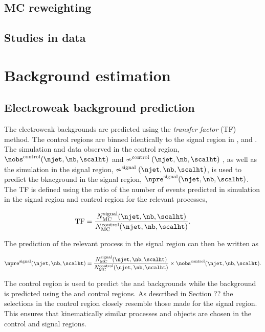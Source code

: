 \subsection{MC reweighting}
\subsection{Studies in data}
\section{Background estimation}
\subsection{Electroweak background prediction}
The electroweak backgrounds are predicted using the \emph{transfer factor} (TF)
method. The control regions are binned identically
to the signal region in \scalht, \nj and \nb. The simulation and data observed in the control region,
$\nobs^{\rm control}(\njet,\nb,\scalht)$ and $\nsim^{\rm control}(\njet,\nb,\scalht)$ 
, as well as the simulation in the signal region, $\nsim^{\rm signal}(\njet,\nb,\scalht)$, 
is used to predict the bkacground in the signal region, $\npre^{\rm signal}(\njet,\nb,\scalht)$. 
The TF is defined using the ratio of the number of events predicted in 
simulation in the signal region and control region for the relevant processes,

\begin{equation}
  \label{equ:tf-ratio}
  {\rm TF} = \frac{N_{\rm MC}^{\rm signal}(\njet,\nb,\scalht)}{N_{\rm
      MC}^{\rm control}(\njet,\nb,\scalht)}.
\end{equation}

The prediction of the relevant process in the signal region can then be written as

\begin{equation}
  \label{equ:pred-method}
  \npre^{\rm signal}(\njet,\nb,\scalht) = \frac{N_{\rm MC}^{\rm
      signal}(\njet,\nb,\scalht)}{N_{\rm MC}^{\rm
      control}(\njet,\nb,\scalht)} \times \nobs^{\rm
    control}(\njet,\nb,\scalht).
\end{equation}

The \mj control region is used to predict the \wj and \ttbar backgrounds while the
\znunu background is predicted using the \mmj and \gj control regions. As described
in Section ?? the selections in the control region closely resemble those made for
the signal region. This ensures that kinematically similar processes and objects
are chosen in the control and signal regions.

